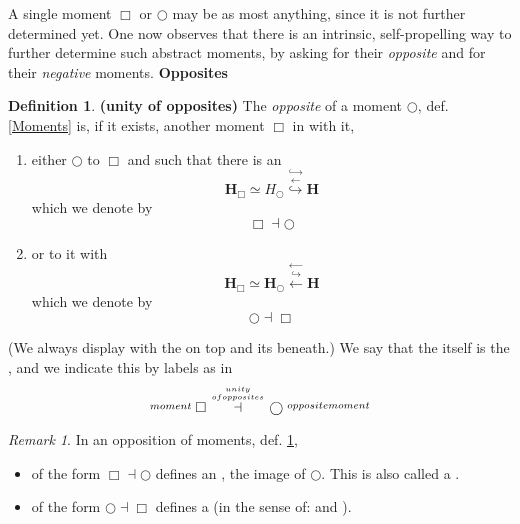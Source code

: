 \documentclass[12pt,titlepage]{article}
\theoremstyle{plain}
\theoremstyle{definition}
\newtheorem{defn}{Definition}
\theoremstyle{remark}
\newtheorem{remark}{Remark}
\begin{document}
A single moment $\Box$ or $\bigcirc$ may be  as most anything, since it is not further determined yet. One now observes that there is an intrinsic, self-propelling way to further determine such abstract moments, by asking for their \emph{opposite} and for their \emph{negative} moments.
\textbf{Opposites}
\begin{defn}
\label{UnityOfOpposites}\hypertarget{UnityOfOpposites}{}
\textbf{(unity of opposites)}
The \emph{opposite} of a moment $\bigcirc$, def. \ref{Moments} is, if it exists, another moment $\Box$ in  with it,
\begin{enumerate}%
\item either $\bigcirc$  to $\Box$ and such that there is an 
\begin{displaymath}
\mathbf{H}_{\Box}\simeq H_{\bigcirc}
\stackrel{\hookrightarrow}{\stackrel{\longleftarrow}{\hookrightarrow}}
\mathbf{H}
\end{displaymath}
which we denote by
\begin{displaymath}
\Box \dashv \bigcirc
\end{displaymath}
\item or  to it with
\begin{displaymath}
\mathbf{H}_{\Box}\simeq \mathbf{H}_{\bigcirc}
\stackrel{\longleftarrow}{\stackrel{\hookrightarrow}{\longleftarrow}}
\mathbf{H}
\end{displaymath}
which we denote by
\begin{displaymath}
\bigcirc \dashv \Box
\end{displaymath}
\end{enumerate}
(We always display  with the  on top and its  beneath.)
We say that the  itself is the , and we indicate this by labels as in
\begin{displaymath}
\stackrel{moment}{} \Box \stackrel{unity \atop {ofopposites}}{\dashv} \bigcirc \stackrel{oppositemoment}{}
\end{displaymath}
\end{defn}
\begin{remark}
\label{}\hypertarget{}{}
In  an opposition of moments, def. \ref{UnityOfOpposites},
\begin{itemize}%
\item of the form $\Box \dashv \bigcirc$ defines an  , the image of $\bigcirc$. This is also called a .
\item of the form $\bigcirc \dashv \Box$ defines a  (in the sense of:  and ).
\end{itemize}
\end{remark}
\end{document}
